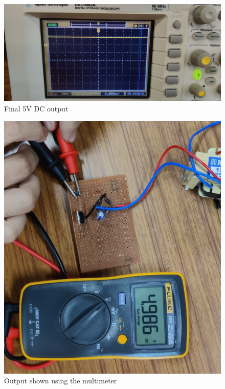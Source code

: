 \documentclass[journal,12pt,twocolumn]{IEEEtran}
\begin{document}
\begin{figure}
    \centering
    \includegraphics[width = \columnwidth]{figures/final.jpg}
    \caption{Final 5V DC output}
    \label{fig:final}
\end{figure}

\begin{figure}
    \centering
    \includegraphics[width=\columnwidth]{figures/final_multi.jpg}
    \caption{Output shown using the multimeter}
    \label{fig:final_multi}
\end{figure}
\end{document}
